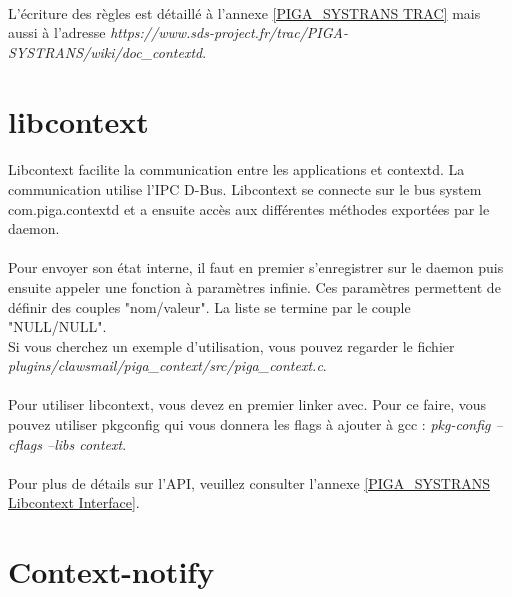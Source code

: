    		\paragraph*{}
   			L'écriture des règles est détaillé à l'annexe \ref{PIGA_SYSTRANS TRAC} mais aussi à l'adresse \emph{https://www.sds-project.fr/trac/PIGA-SYSTRANS/wiki/doc\_contextd}.
   					
	\section{libcontext}
		\paragraph*{}
			Libcontext facilite la communication entre les applications et contextd. La communication utilise l'IPC D-Bus. Libcontext se connecte sur le bus system com.piga.contextd et a ensuite accès aux différentes méthodes exportées par le daemon.
			
		\paragraph*{}
			Pour envoyer son état interne, il faut en premier s'enregistrer sur le daemon puis ensuite appeler une fonction à paramètres infinie. Ces paramètres permettent de définir des couples "nom/valeur". La liste se termine par le couple "NULL/NULL".\\
			Si vous cherchez un exemple d'utilisation, vous pouvez regarder le fichier \emph{plugins/claws\-mail/piga\_context/src/piga\_context.c}.
			
		\paragraph*{}
			Pour utiliser libcontext, vous devez en premier linker avec. Pour ce faire, vous pouvez utiliser pkgconfig qui vous donnera les flags à ajouter à gcc : \emph{pkg-config --cflags --libs context}.
			
		\paragraph*{}
			Pour plus de détails sur l'API, veuillez consulter l'annexe \ref{PIGA_SYSTRANS Libcontext Interface}.
		
	\section{Context-notify}
